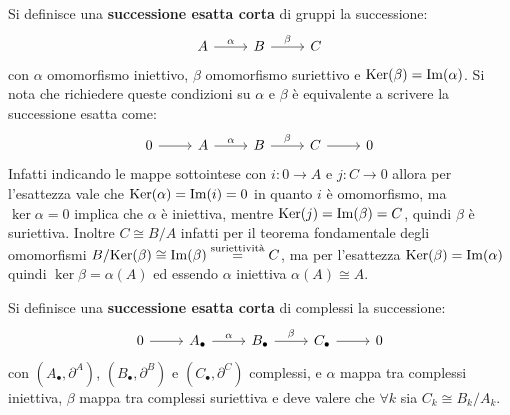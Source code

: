 \begin{definition}
  Si definisce una \textbf{successione esatta corta} di
  gruppi la successione:
  \[
    \begin{tikzcd}
      A \arrow{r}{\alpha} & B \arrow{r}{\beta} & C
    \end{tikzcd}
  \]
  con $ \alpha $ omomorfismo iniettivo, $ \beta $ omomorfismo suriettivo e $ \mathrm{Ker}( \beta) = \mathrm{Im}( \alpha ) $.
  Si nota che richiedere queste condizioni su $ \alpha $ e $ \beta $ è equivalente a scrivere la
  successione esatta come:
  \[
    \begin{tikzcd}
      0 \arrow{r}{} & A \arrow{r}{\alpha} & B\arrow{r}{\beta} & C \arrow{r}{} & 0
    \end{tikzcd}
  \]
  Infatti indicando le mappe sottointese con $ i \colon 0 \to A $ e
  $ j \colon C \to 0 $ allora per l'esattezza vale che
  $ \mathrm{Ker}( \alpha) = \mathrm{Im}( i ) = 0 $ in quanto $ i $ è omomorfismo, ma
  $ \ker{\alpha} = 0 $ implica che $ \alpha $ è iniettiva, mentre
  $ \mathrm{Ker}( j) = \mathrm{Im}( \beta ) = C $, quindi $ \beta $ è suriettiva. Inoltre
  $ C \cong {B} \slash {A} $ infatti per il teorema fondamentale degli omomorfismi
  $ {B} \slash {\mathrm{Ker}( \beta)} \cong \mathrm{Im}( \beta ) \overset{\text{suriettività}}{=} C $, ma per
  l'esattezza $ \mathrm{Ker}( \beta) = \mathrm{Im}( \alpha ) $ quindi $ \ker{\beta} = \alpha(A) $ ed essendo
  $ \alpha $ iniettiva $ \alpha(A) \cong A $.
\end{definition}

\begin{definition}
  Si definisce una \textbf{successione esatta corta} di
  complessi la successione:
  \[
    \begin{tikzcd}
      0 \arrow{r}{} & A_\bullet \arrow{r}{\alpha} & B_\bullet \arrow{r}{\beta} & C_\bullet \arrow{r}{} & 0
    \end{tikzcd}
  \]
  con $ (A_\bullet, \partial^A) $, $ (B_\bullet, \partial^B) $ e $ (C_\bullet, \partial^C) $ complessi, e
  $ \alpha $ mappa tra complessi iniettiva, $ \beta $ mappa tra complessi suriettiva
  e deve valere che $ \forall k $ sia $ C_k \cong {B_k} \slash {A_k} $.
\end{definition}

